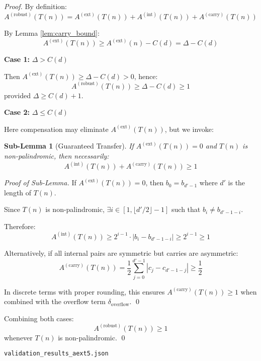 \documentclass[12pt,a4paper]{article}
\newtheorem{sublemma}[theorem]{Sub-Lemma}
\begin{document}
\begin{proof}
By definition:
$$A^{(\mathrm{robust})}(T(n)) = A^{(\mathrm{ext})}(T(n)) + A^{(\mathrm{int})}(T(n)) 
+ A^{(\mathrm{carry})}(T(n))$$

By Lemma \ref{lem:carry_bound}:
$$A^{(\mathrm{ext})}(T(n)) \ge A^{(\mathrm{ext})}(n) - C(d) = \Delta - C(d)$$

	\textbf{Case 1:} $\Delta > C(d)$

Then $A^{(\mathrm{ext})}(T(n)) \ge \Delta - C(d) > 0$, hence:
$$A^{(\mathrm{robust})}(T(n)) \ge \Delta - C(d) \ge 1$$
provided $\Delta \ge C(d) + 1$.

	\textbf{Case 2:} $\Delta \le C(d)$

Here compensation may eliminate $A^{(\mathrm{ext})}(T(n))$, but we invoke:

\begin{sublemma}[Guaranteed Transfer]\label{sublem:guaranteed_transfer}
If $A^{(\mathrm{ext})}(T(n)) = 0$ and $T(n)$ is non-palindromic, then 
necessarily:
$$A^{(\mathrm{int})}(T(n)) + A^{(\mathrm{carry})}(T(n)) \ge 1$$
\end{sublemma}

\begin{proof}[Proof of Sub-Lemma]
If $A^{(\mathrm{ext})}(T(n)) = 0$, then $b_0 = b_{d'-1}$ where $d'$ is the 
length of $T(n)$. 

Since $T(n)$ is non-palindromic, $\exists i \in [1, \lfloor d'/2 \rfloor - 1]$ 
such that $b_i \neq b_{d'-1-i}$. 

Therefore:
$$A^{(\mathrm{int})}(T(n)) \ge 2^{i-1} \cdot |b_i - b_{d'-1-i}| \ge 2^{i-1} \ge 1$$

Alternatively, if all internal pairs are symmetric but carries are asymmetric:
$$A^{(\mathrm{carry})}(T(n)) = \frac{1}{2}\sum_{j=0}^{d'-1} |c_j - c_{d'-1-j}| 
\ge \frac{1}{2}$$

In discrete terms with proper rounding, this ensures 
$A^{(\mathrm{carry})}(T(n)) \ge 1$ when combined with the overflow term 
$\delta_{\mathrm{overflow}}$.
\qed
\end{proof}

Combining both cases:
$$A^{(\mathrm{robust})}(T(n)) \ge 1$$
whenever $T(n)$ is non-palindromic.
\qed
\end{proof}

\begin{center}
\verb|validation_results_aext5.json|
\end{center}
\end{document}
